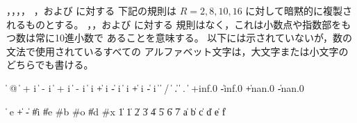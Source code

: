 ，，，，
，および  に対する
下記の規則は \hbox{$R = 2, 8, 10, 16$} に対して暗黙的に複製されるものとする。
，，および  に対する
規則はなく，これは小数点や指数部をもつ数は常に10進小数で
あることを意味する。
以下には示されていないが，数の文法で使用されているすべての
アルファベット文字は，大文字または小文字のどちらでも書ける。
\begin{grammar}%
 \:  
 \: %
      \|  @ 
   \> \|  +  i %
      \|  -  i
   \> \|  + i %
      \|  - i %
      \|   i 
   \> \| +  i %
      \| -  i
   \> \|  i %
      \| + i %
      \| - i
 \:  
   \> \| 
 \: %
   \> \|  / 
   \> \| 
 \: %
          
   \> \| .  
   \> \|  .  
 \: 
 \: %
          
   \> \|  
 \: +inf.0 \| -inf.0 \| +nan.0 \| -nan.0
\end{grammar}

\begin{grammar}%
 \:  
   \> \|   
 \: e
 \:   \| + \|  -
 \:  \| \#i \| \#e
 \: \#b
 \: \#o
 \:  \| \#d
 \: \#x
  \| 1
  \| 1 \| 2 \| 3 \| 4 \| 5 \| 6 \| 7
 \: 
 \:  \| a \| b \| c \| d \| e \| f %
\end{grammar}


